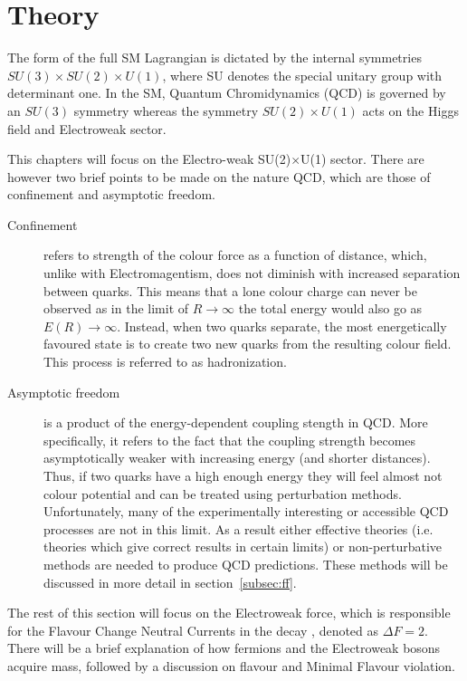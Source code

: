 \chapter{Theory}
The form of the full \gls{SM} Lagrangian is dictated by the internal symmetries $SU(3)\times SU(2)\times U(1)$, where SU denotes the special unitary group with determinant one.  In the SM, Quantum Chromidynamics (\Gls{QCD}) is governed by an $SU(3)$ symmetry whereas the symmetry $SU(2)\times U(1)$ acts on the Higgs field and Electroweak sector.

This chapters will focus on the Electro-weak SU(2)$\times$U(1) sector.  There are however two brief points to be made on the nature QCD, which are those of confinement and asymptotic freedom.
\begin{description}
\item [Confinement] refers to strength of the colour force as a function of distance, which, unlike with Electromagentism,  does not diminish with increased separation between quarks. This means that a lone colour charge can never be observed as in the limit of $R\to \infty$ the total energy would also go as $E(R)\to \infty$. Instead, when two quarks separate, the most energetically favoured state is to create two new quarks from the resulting colour field. This process is referred to as hadronization.

\item[Asymptotic freedom] is a product of the energy-dependent coupling stength in QCD. More specifically, it refers to the fact that the coupling strength becomes asymptotically weaker with increasing energy (and shorter distances). %
  Thus, if two quarks have a high enough energy they will feel almost not colour potential and can be treated using perturbation methods. Unfortunately, many of the experimentally interesting or accessible QCD processes are not in this limit. As a result either effective theories (i.e. theories which give correct results in certain limits) or non-perturbative methods are needed to produce QCD predictions. These methods will be discussed in more detail in section~\ref{subsec:ff}.
\end{description}
The rest of this section will focus on the Electroweak force, which is responsible for the Flavour Change Neutral Currents in the decay \Lbpi, denoted as $\Delta F = 2$. There will be a brief explanation of how fermions and the Electroweak bosons acquire mass, followed by a discussion on flavour and Minimal Flavour violation.

